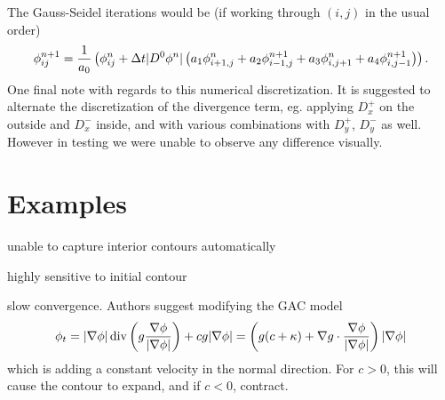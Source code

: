 The Gauss-Seidel iterations would be (if working through $(i,j)$ in the usual order)
\begin{align*}
\phi^{n+1}_{ij} 
= \frac{1}{a_0} 
\left( \phi^n_{ij} + \Delta t \lvert D^0 \phi^n\rvert
\left( a_1 \phi^n_{i+1,j} + a_2 \phi^{n+1}_{i-1,j} + a_3 \phi^{n}_{i,j+1} + a_4 \phi^{n+1}_{i,j-1}
\right)
\right).
\end{align*}
One final note with regards to this numerical discretization. It is suggested to alternate the discretization of the divergence term, eg. applying $D^+_x$ on the outside and $D^-_x$ inside, and with various combinations with $D^+_y$, $D^-_y$ as well. However in testing we were unable to observe any difference visually.


\section{Examples} 

unable to capture interior contours automatically

highly sensitive to initial contour

slow convergence. Authors suggest modifying the GAC model
\begin{align*}
\phi_t = 
\lvert\nabla \phi\rvert \operatorname{div}\left( g \frac{\nabla \phi}{\lvert\nabla \phi\rvert} \right) 
+ cg \lvert\nabla \phi\rvert 
= \left( g ( c + \kappa) + \nabla g \cdot \frac{\nabla \phi}{\lvert\nabla \phi\rvert} \right) \lvert\nabla \phi\rvert
\end{align*}
which is adding a constant velocity in the normal direction. For $c>0$, this will cause the contour to expand, and if $c<0$, contract.

